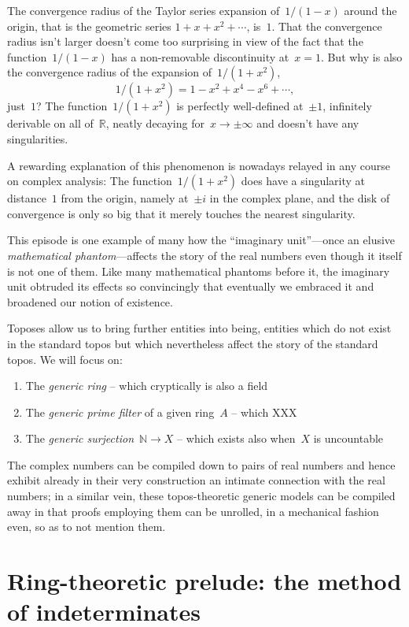 \documentclass[10pt,reqno,a4paper,openany]{amsbook}
\theoremstyle{definition}
\theoremstyle{plain}
\theoremstyle{remark}
\newcommand{\NN}{\mathbb{N}}
\newcommand{\RR}{\mathbb{R}}
\newcommand{\?}{\,{:}\,}
\renewcommand{\_}{\mathpunct{.}\,}
\begin{document}
The convergence radius of the Taylor series expansion of~$1/(1-x)$ around the
origin, that is the geometric series
$1 + x + x^2 + \cdots$,
is~$1$. That the convergence radius isn't larger doesn't come too surprising in
view of the fact that the function~$1/(1-x)$ has a non-removable discontinuity
at~$x = 1$. But why is also the convergence radius of the expansion
of~$1/(1+x^2)$,
\[ 1/(1+x^2) = 1 - x^2 + x^4 - x^6 + \cdots, \]
just~$1$? The function~$1/(1+x^2)$ is
perfectly well-defined at~$\pm 1$, infinitely derivable on all of~$\RR$, neatly
decaying for~$x \to \pm\infty$ and doesn't have any singularities.

A rewarding explanation of this phenomenon is nowadays relayed in any course on
complex analysis: The function~$1/(1+x^2)$ does have a singularity at
distance~$1$ from the origin, namely at~$\pm i$ in the complex plane, and the disk
of convergence is only so big that it merely touches the nearest singularity.

This episode is one example of many how the ``imaginary unit''---once
an elusive \emph{mathematical phantom}---affects the story of the real numbers even
though it itself is not one of them. Like many mathematical phantoms before it,
the imaginary unit obtruded its effects so convincingly that eventually we
embraced it and broadened our notion of existence.

Toposes allow us to bring further entities into being, entities which do not
exist in the standard topos but which nevertheless affect the story of the
standard topos. We will focus on:
\begin{enumerate}
\item The \emph{generic ring} -- which cryptically is also a field
\item The \emph{generic prime filter} of a given ring~$A$ -- which
XXX
\item The \emph{generic surjection}~$\NN \to X$ -- which exists also when~$X$
is uncountable
\end{enumerate}
The complex numbers can be compiled down to pairs of real numbers and hence
exhibit already in their very construction an intimate connection with the real
numbers; in a similar vein, these topos-theoretic generic models can be
compiled away in that proofs employing them can be unrolled, in a mechanical
fashion even, so as to not mention them.


\section{Ring-theoretic prelude: the method of indeterminates}
\end{document}

